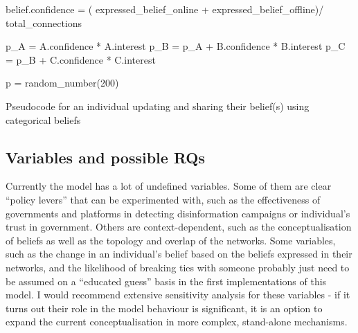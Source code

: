 \documentclass[10pt,a4paper]{article}
\begin{document}
\begin{algorithm}[H]
	\SetAlgoLined
	
	\BlankLine
	\BlankLine
	
	\BlankLine
	\BlankLine
		
		{
		
		\BlankLine
		
	
		belief.confidence = ( expressed\_belief\_online + expressed\_belief\_offline)/ total\_connections\;
	}
		\BlankLine
		\BlankLine
		
		\BlankLine
		\BlankLine
		
		p\_A = A.confidence * A.interest\;
		p\_B = p\_A + B.confidence * B.interest\;
		p\_C = p\_B + C.confidence * C.interest\;
		
		p = random\_number(200)\;
		
	
	
	\caption{Pseudocode for an individual updating and sharing their belief(s) using categorical beliefs}
\end{algorithm}








\subsection{Variables and possible RQs}
Currently the model has a lot of undefined variables. Some of them are clear ``policy levers'' that can be experimented with, such as the effectiveness of governments and platforms in detecting disinformation campaigns or individual's trust in government. Others are context-dependent, such as the conceptualisation of beliefs as well as the topology and overlap of the networks. Some variables, such as the change in an individual's belief based on the beliefs expressed in their networks, and the likelihood of breaking ties with someone probably just need to be assumed on a ``educated guess'' basis in the first implementations of this model. I would recommend extensive sensitivity analysis for these variables - if it turns out their role in the model behaviour is significant, it is an option to expand the current conceptualisation in more complex, stand-alone mechanisms.\\
\end{document}
